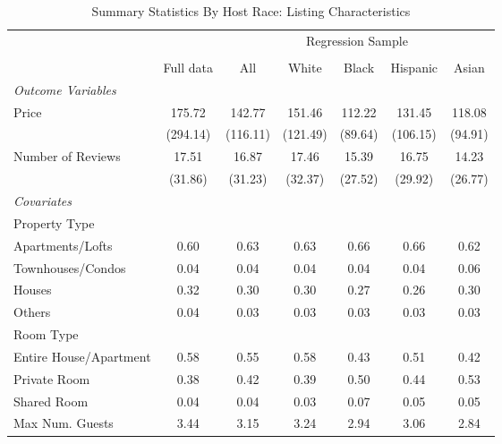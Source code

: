 \begin{table}[htbp]
\caption{Summary Statistics By Host Race: Listing Characteristics}
\begin{center}%
\small\begin{tabular}{l c | c | c c c c}
& \multicolumn{1}{c}{} & \multicolumn{5}{c}{Regression Sample}
\\
 \cmidrule(r){3-7}
\\
 & \multicolumn{1}{c}{Full data} & \multicolumn{1}{c}{All} & White & Black & Hispanic & Asian
\\
\hline\hline\noalign{\smallskip} 
 \textit{\textit{Outcome Variables}} & & & & & & \\ Price & 175.72 & 142.77 & 151.46 & 112.22 & 131.45 & 118.08 \\
 & (294.14) & (116.11) & (121.49) & (89.64) & (106.15) & (94.91) \\
 Number of Reviews & 17.51 & 16.87 & 17.46 & 15.39 & 16.75 & 14.23 \\
 & (31.86) & (31.23) & (32.37) & (27.52) & (29.92) & (26.77) \\
 \textit{Covariates} & & & & & & \\ \hline Property Type & & & & & & \\ \hspace{10bp}Apartments/Lofts    & 0.60 & 0.63 & 0.63 & 0.66 & 0.66 & 0.62 \\ \hspace{10bp}Townhouses/Condos   & 0.04 & 0.04 & 0.04 & 0.04 & 0.04 & 0.06 \\ \hspace{10bp}Houses                      & 0.32 & 0.30 & 0.30 & 0.27 & 0.26 & 0.30 \\ \hspace{10bp}Others                              & 0.04 & 0.03 & 0.03 & 0.03 & 0.03 & 0.03 \\Room Type &&&&&& \\ \hspace{10bp}Entire House/Apartment      & 0.58 & 0.55 & 0.58 & 0.43 & 0.51 & 0.42 \\ \hspace{10bp}Private Room                        & 0.38 & 0.42 & 0.39 & 0.50 & 0.44 & 0.53 \\ \hspace{10bp}Shared Room                         & 0.04 & 0.04 & 0.03 & 0.07 & 0.05 & 0.05 \\ Max Num. Guests & 3.44 & 3.15 & 3.24 & 2.94 & 3.06 & 2.84 \\

\end{tabular}
\end{center}
\end{table}
